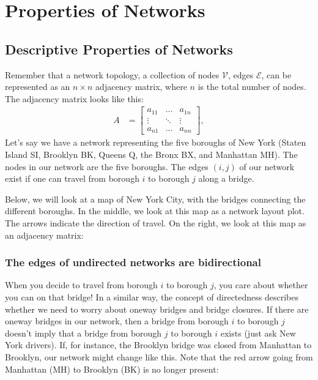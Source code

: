 \documentclass[letterpaper,10pt,english]{jupyterBook}
\begin{document}
\section{Properties of Networks}
\label{\detokenize{representations/ch4/properties-of-networks:properties-of-networks}}\label{\detokenize{representations/ch4/properties-of-networks::doc}}

\subsection{Descriptive Properties of Networks}
\label{\detokenize{representations/ch4/properties-of-networks:descriptive-properties-of-networks}}
\sphinxAtStartPar
Remember that a network topology, a collection of nodes \(\mathcal V\), edges \(\mathcal E\), can be represented as an \(n \times n\) adjacency matrix, where \(n\) is the total number of nodes. The adjacency matrix looks like this:
\begin{align*}
    A &= \begin{bmatrix}
        a_{11} & ... & a_{1n} \\
        \vdots & \ddots & \vdots \\
        a_{n1} & ... & a_{nn}
    \end{bmatrix},
\end{align*}
\sphinxAtStartPar
Let’s say we have a network representing the five boroughs of New York (Staten Island SI, Brooklyn BK, Queens Q, the Bronx BX, and Manhattan MH). The nodes in our network are the five boroughs. The edges \((i,j)\) of our network exist if one can travel from borough \(i\) to borough \(j\) along a bridge.

\sphinxAtStartPar
Below, we will look at a map of New York City, with the bridges connecting the different boroughs. In the middle, we look at this map as a network layout plot. The arrows indicate the direction of travel. On the right, we look at this map as an adjacency matrix:

\noindent{}


\subsubsection{The edges of undirected networks are bi\sphinxhyphen{}directional}
\label{\detokenize{representations/ch4/properties-of-networks:the-edges-of-undirected-networks-are-bi-directional}}
\sphinxAtStartPar
When you decide to travel from borough \(i\) to borough \(j\), you care about whether you can  on that bridge! In a similar way, the concept of directedness describes whether we need to worry about one\sphinxhyphen{}way bridges and bridge closures. If there are one\sphinxhyphen{}way bridges in our network, then a bridge from borough \(i\) to borough \(j\) doesn’t  imply that a bridge from borough \(j\) to borough \(i\) exists (just ask New York drivers). If, for instance, the Brooklyn bridge was closed from Manhattan to Brooklyn, our network might change like this. Note that the red arrow going from Manhattan (MH) to Brooklyn (BK) is no longer present:
\end{document}
